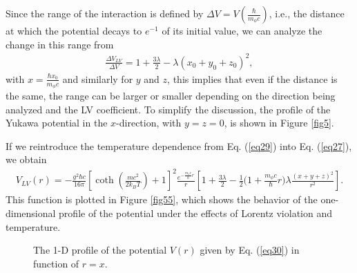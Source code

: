 \documentclass[11pt,showpacs,preprintnumbers,amsmath,amssymb,prd,nofootinbib,superscriptaddress]{revtex4-2}
\begin{document}
Since the range of the interaction is defined by $\Delta V = V\left(\frac{\hbar}{m_{\phi}c}\right)$, i.e., the distance at which the potential decays to $e^{-1}$ of its initial value, we can analyze the change in this range from
\begin{eqnarray}
    \frac{\Delta V_{LV}}{\Delta V}=1+\frac{3\lambda}{2}-\lambda(x_0+y_0+z_0)^2,
\end{eqnarray}
with $x = \frac{\hbar x_0}{m_{\phi}c}$ and similarly for $y$ and $z$, this implies that even if the distance is the same, the range can be larger or smaller depending on the direction being analyzed and the LV coefficient. To simplify the discussion, the profile of the Yukawa potential in the $x$-direction, with $y = z = 0$, is shown in Figure \ref{fig5}.

If we reintroduce the temperature dependence from Eq. (\ref{eq29}) into Eq. (\ref{eq27}), we obtain
\begin{eqnarray}
    V_{LV}(r)=-\frac{g^2\hbar c}{16\pi}\left[\coth{\left(\frac{mc^2}{2k_BT}\right)}+1\right]^2\frac{e^{-\frac{m_{\phi}c}{\hbar}r}}{r}\left[1+\frac{3\lambda}{2}-\frac{1}{2}\biggl(1+\frac{m_\phi c}{\hbar}r\biggr)\lambda\frac{(x+y+z)^2}{r^2}\right].\label{eq30}
\end{eqnarray}
This function is plotted in Figure \ref{fig55}, which shows the behavior of the one-dimensional profile of the potential under the effects of Lorentz violation and temperature.
\begin{figure}[ht]
    \centering
    \caption{The 1-D profile of the potential $V(r)$ given by Eq. (\ref{eq30}) in function of $r=x$.}
   \end{figure}
\end{document}
